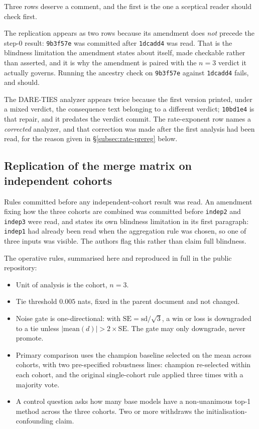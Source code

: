 Three rows deserve a comment, and the first is the one a sceptical reader
should check first.

The replication appears as two rows because its amendment does \emph{not}
precede the step-0 result: \texttt{9b3f57e} was committed after
\texttt{1dcadd4} was read. That is the blindness limitation the amendment
states about itself, made checkable rather than asserted, and it is why the
amendment is paired with the $n=3$ verdict it actually governs. Running the
ancestry check on \texttt{9b3f57e} against \texttt{1dcadd4} fails, and should.

The DARE-TIES analyzer appears twice because the first version printed, under a
mixed verdict, the consequence text belonging to a different verdict;
\texttt{10bd1e4} is that repair, and it predates the verdict commit. The
rate-exponent row names a \emph{corrected} analyzer, and that correction was
made after the first analysis had been read, for the reason given in
\S\ref{subsec:rate-prereg} below.

\subsection{Replication of the merge matrix on independent cohorts}

Rules committed before any independent-cohort result was read. An
amendment fixing how the three cohorts are combined was committed before
\texttt{indep2} and \texttt{indep3} were read, and states its own
blindness limitation in its first paragraph: \texttt{indep1} had already
been read when the aggregation rule was chosen, so one of three inputs
was visible. The authors flag this rather than claim full blindness.

The operative rules, summarised here and reproduced in full in the
public repository:
\begin{itemize}
\item Unit of analysis is the cohort, $n = 3$.
\item Tie threshold $0.005$ nats, fixed in the parent document and not
  changed.
\item Noise gate is one-directional: with
  $\mathrm{SE} = \mathrm{sd}/\sqrt{3}$, a win or loss is downgraded to a
  tie unless $|\mathrm{mean}(d)| > 2\times\mathrm{SE}$. The gate may only
  downgrade, never promote.
\item Primary comparison uses the champion baseline selected on the mean
  across cohorts, with two pre-specified robustness lines: champion
  re-selected within each cohort, and the original single-cohort rule
  applied three times with a majority vote.
\item A control question asks how many base models have a non-unanimous
  top-1 method across the three cohorts. Two or more withdraws the
  initialisation-confounding claim.
\end{itemize}

